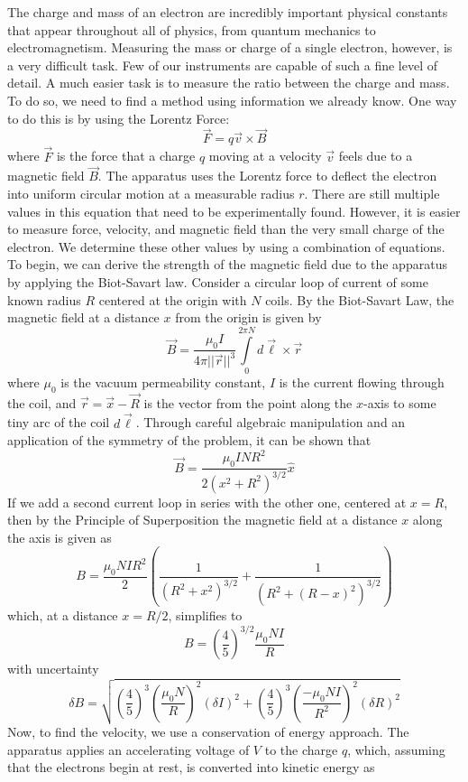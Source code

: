 \documentclass[prX,nofootinbib,notitlepage]{revtex4-1}
\begin{document}
The charge and mass of an electron are incredibly important physical constants that appear throughout all of physics, from quantum mechanics to electromagnetism. Measuring the mass or charge of a single electron, however, is a very difficult task. Few of our instruments are capable of such a fine level of detail. A much easier task is to measure the ratio between the charge and mass. To do so, we need to find a method using information we already know. One way to do this is by using the Lorentz Force:
$$
\vec{F} = q\vec{v} \times \vec{B}
$$
where $\vec{F}$ is the force that a charge $q$ moving at a velocity $\vec{v}$ feels due to a magnetic field $\vec{B}$. The apparatus uses the Lorentz force to deflect the electron into uniform circular motion at a measurable radius $r$. There are still multiple values in this equation that need to be experimentally found. However, it is easier to measure force, velocity, and magnetic field than the very small charge of the electron. We determine these other values by using a combination of equations. To begin, we can derive the strength of the magnetic field due to the apparatus by applying the Biot-Savart law. Consider a circular loop of current of some known radius $R$ centered at the origin with $N$ coils. By the Biot-Savart Law, the magnetic field at a distance $x$ from the origin is given by
$$
\vec{B} = \frac{\mu_{0} I}{4 \pi ||\vec{r}||^{3} } \int\limits_{0}^{2\pi N}{d\vec{\ell} \times \vec{r}}
$$
where $\mu_0$ is the vacuum permeability constant, $I$ is the current flowing through the coil, and $\vec{r} = \vec{x} - \vec{R}$ is the vector from the point along the $x$-axis to some tiny arc of the coil $d\vec{\ell}$. Through careful algebraic manipulation and an application of the symmetry of the problem, it can be shown that 
$$
\vec{B} = \frac{\mu_{0} I N R^{2}}{2(x^{2} + R^{2})^{3/2}} \hat{x}
$$
If we add a second current loop in series with the other one, centered at $x = R$, then by the Principle of Superposition the magnetic field at a distance $x$ along the axis is given as
$$
B = \frac{\mu_{0} N I R^{2}}{2} \left( \frac{1}{(R^{2} + x^{2})^{3/2}} + \frac{1}{(R^{2} + (R-x)^{2})^{3/2}} \right)
$$
which, at a distance $x = R/2$, simplifies to 
$$
B = \left(\frac{4}{5}\right)^{3/2} \frac{\mu_{0} N I}{R}
$$
with uncertainty
$$
\delta B = \sqrt{\left(\frac{4}{5}\right)^{3} \left(\frac{\mu_{0} N }{R}\right)^{2} (\delta I)^{2} + \left(\frac{4}{5}\right)^{3} \left(\frac{- \mu_{0} N I}{R^{2}}\right)^{2} (\delta R)^{2}} 
$$
Now, to find the velocity, we use a conservation of energy approach. The apparatus applies an accelerating voltage of $V$ to the charge $q$, which, assuming that the electrons begin at rest, is converted into kinetic energy as
\end{document}
